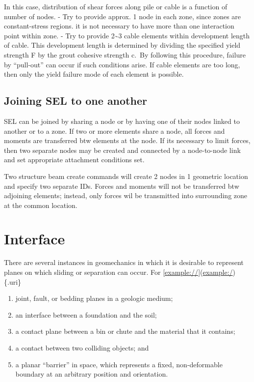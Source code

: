 \documentclass[a4paper, nobind]{templates/ociamthesis}
\providecommand{\tightlist}{%
  \setlength{\itemsep}{0pt}\setlength{\parskip}{0pt}}
\begin{document}
In this case, distribution of shear forces along pile or cable is a
function of number of nodes. - Try to provide approx. 1 node in each
zone, since zones are constant-stress regions. it is not necessary to
have more than one interaction point within zone. - Try to provide 2\textasciitilde3
cable elements within development length of cable. This development
length is determined by dividing the specified yield strength F by the
grout cohesive strength c.~By following this procedure, failure by
``pull-out'' can occur if such conditions arise. If cable elements are too
long, then only the yield failure mode of each element is possible.

\hypertarget{joining-sel-to-one-another}{%
\subsection{Joining SEL to one another}\label{joining-sel-to-one-another}}

SEL can be joined by sharing a node or by having one of their nodes
linked to another or to a zone. If two or more elements share a node,
all forces and moments are transferred btw elements at the node. If its
necessary to limit forces, then two separate nodes may be created and
connected by a node-to-node link and set appropriate attachment
conditions set.

Two structure beam create commands will create 2 nodes in 1 geometric
location and specify two separate IDs. Forces and moments will not be
transferred btw adjoining elements; instead, only forces wil be
transmitted into surrounding zone at the common location.

\hypertarget{interface-1}{%
\section{Interface}\label{interface-1}}

There are several instances in geomechanics in which it is desirable to
represent planes on which sliding or separation can occur. For
{[}\url{example://}{]}(\url{example:/})\{.uri\}

\begin{enumerate}
\def\labelenumi{\arabic{enumi}.}
\tightlist
\item
  joint, fault, or bedding planes in a geologic medium;
\item
  an interface between a foundation and the soil;
\item
  a contact plane between a bin or chute and the material that it
  contains;
\item
  a contact between two colliding objects; and
\item
  a planar ``barrier'' in space, which represents a fixed,
  non-deformable boundary at an arbitrary position and orientation.\\
\end{enumerate}
\end{document}
